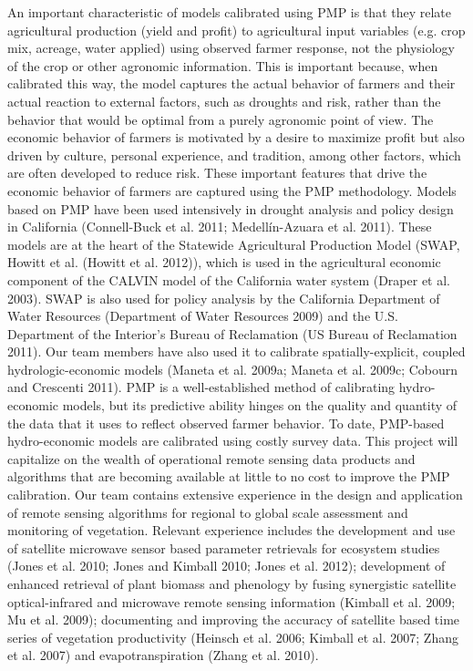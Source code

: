 \documentclass[review]{elsarticle}
\begin{document}
An important characteristic of models calibrated using PMP is that they relate agricultural production (yield and profit) to agricultural input variables (e.g. crop mix, acreage, water applied) using observed farmer response, not the physiology of the crop or other agronomic information. This is important because, when calibrated this way, the model captures the actual behavior of farmers and their actual reaction to external factors, such as droughts and risk, rather than the behavior that would be optimal from a purely agronomic point of view. The economic behavior of farmers is motivated by a desire to maximize profit but also driven by culture, personal experience, and tradition, among other factors, which are often developed to reduce risk. These important features that drive the economic behavior of farmers are captured using the PMP methodology. Models based on PMP have been used intensively in drought analysis and policy design in California (Connell-Buck et al. 2011; Medellín-Azuara et al. 2011). These models are at the heart of the Statewide Agricultural Production Model (SWAP, Howitt et al. (Howitt et al. 2012)), which is used in the agricultural economic component of the CALVIN model of the California water system (Draper et al. 2003). SWAP is also used for policy analysis by the California Department of Water Resources (Department of Water Resources 2009) and the U.S. Department of the Interior’s Bureau of Reclamation (US Bureau of Reclamation 2011). Our team members have also used it to calibrate spatially-explicit, coupled hydrologic-economic models (Maneta et al. 2009a; Maneta et al. 2009c; Cobourn and Crescenti 2011). 
PMP is a well-established method of calibrating hydro-economic models, but its predictive ability hinges on the quality and quantity of the data that it uses to reflect observed farmer behavior. To date, PMP-based hydro-economic models are calibrated using costly survey data. This project will capitalize on the wealth of operational remote sensing data products and algorithms that are becoming available at little to no cost to improve the PMP calibration. Our team contains extensive experience in the design and application of remote sensing algorithms for regional to global scale assessment and monitoring of vegetation. Relevant experience includes the development and use of satellite microwave sensor based parameter retrievals for ecosystem studies (Jones et al. 2010; Jones and Kimball 2010; Jones et al. 2012); development of enhanced retrieval of plant biomass and phenology by fusing synergistic satellite optical-infrared and microwave remote sensing information (Kimball et al. 2009; Mu et al. 2009); documenting and improving the accuracy of satellite based time series of vegetation productivity (Heinsch et al. 2006; Kimball et al. 2007; Zhang et al. 2007) and evapotranspiration (Zhang et al. 2010). 
\end{document}
